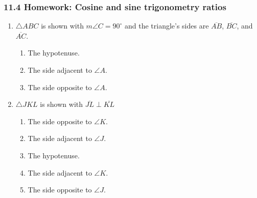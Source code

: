 \documentclass[12pt, twoside]{article}
\begin{document}
\subsubsection*{11.4 Homework: Cosine and sine trigonometry ratios}

\begin{enumerate}

\subsubsection*{Identify each given side of the triangle}
\item $\triangle ABC$ is shown with $m\angle C=90^\circ$ and the triangle's sides are $\overline{AB}$, $\overline{BC}$, and $\overline{AC}$.
  \begin{multicols}{2}
    \begin{enumerate}[itemsep=1cm]
      \item The hypotenuse.
      \item The side adjacent to $\angle A$.
      \item The side opposite to $\angle A$.
    \end{enumerate}
    \end{multicols} \vspace{0.5cm}

\item $\triangle JKL$ is shown with $\overline{JL} \perp \overline{KL}$
  \begin{multicols}{2}
    \begin{enumerate}[itemsep=0.8cm]
      \item The side opposite to $\angle K$.
      \item The side adjacent to $\angle J$.
      \item The hypotenuse.
      \item The side adjacent to $\angle K$.
      \item The side opposite to $\angle J$.
    \end{enumerate}
    \end{multicols} \vspace{0.5cm}
  

\end{enumerate}
\end{document}
